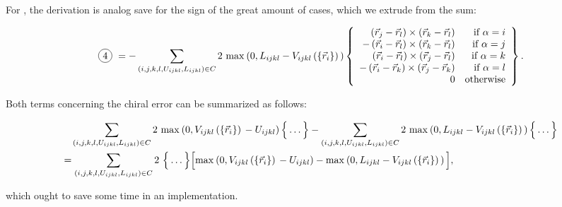 \documentclass[a4paper]{article}
\newcommand*\circled[1]{
  \tikz[baseline=(char.base)]{
    \node[shape=circle,draw,inner sep=2pt] (char) {#1};
  }
}
\begin{document}
For \circled{4}, the derivation is analog save for the sign of the great amount
of cases, which we extrude from the sum:

\begin{equation}
  \text{\circled{4}} = - \chiralSum 2\ \chiralErrorSecondTerm{} \left\{ \begin{array}{rr}
    \posVecDiff{j}{l} \times \posVecDiff{k}{l} & \textrm{if }\alpha = i\\
    - \posVecDiff{i}{l} \times \posVecDiff{k}{l} & \textrm{if }\alpha = j\\
    \posVecDiff{i}{l} \times \posVecDiff{j}{l} & \textrm{if }\alpha = k\\
    - \posVecDiff{i}{k} \times \posVecDiff{j}{k} & \textrm{if }\alpha = l\\
    0 & \textrm{otherwise}
  \end{array} \right\}.
\end{equation}

Both terms concerning the chiral error can be summarized as follows:

\begin{align*}
  &\quad\sum_{\left(i, j, k, l, U_{ijkl}, L_{ijkl}\right) \in C} 2\ \textrm{max}^{} \left( 0, V_{ijkl}\left( \left\{\vec{r}_i \right\} \right){} - U_{ijkl} \right) \Big\{ \ldots \Big\}
  - \sum_{\left(i, j, k, l, U_{ijkl}, L_{ijkl}\right) \in C} 2\ \textrm{max}^{} \left( 0, L_{ijkl} - V_{ijkl}\left( \left\{\vec{r}_i \right\} \right){} \right) \Big\{ \ldots \Big\}\\
  &= \sum_{\left(i, j, k, l, U_{ijkl}, L_{ijkl}\right) \in C} 2\ \Big\{ \ldots \Big\} \Big[ 
    \textrm{max}^{} \left( 0, V_{ijkl}\left( \left\{\vec{r}_i \right\} \right){} - U_{ijkl} \right) - \textrm{max}^{} \left( 0, L_{ijkl} - V_{ijkl}\left( \left\{\vec{r}_i \right\} \right){} \right) 
  \Big],
\end{align*}

which ought to save some time in an implementation.
\end{document}
